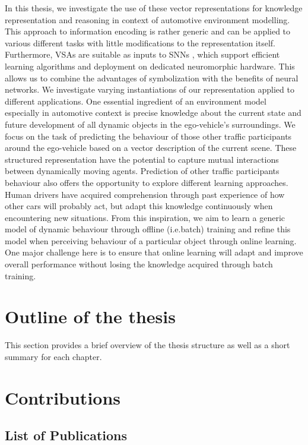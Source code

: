 In this thesis, we investigate the use of these vector representations for knowledge representation and reasoning in context of automotive environment modelling.
This approach to information encoding is rather generic and can be applied to various different tasks with little modifications to the representation itself.
Furthermore, \acp{VSA} are suitable as inputs to \acp{SNN} \cite{Eliasmith2013}, which support efficient learning algorithms and deployment on dedicated neuromorphic hardware.
This allows us to combine the advantages of symbolization with the benefits of neural networks.
We investigate varying instantiations of our representation applied to different applications. 
One essential ingredient of an environment model especially in automotive context is precise knowledge about the current state and future development of all dynamic objects in the ego-vehicle's surroundings.
We focus on the task of predicting the behaviour of those other traffic participants around the ego-vehicle based on a vector description of the current scene.
These structured representation have the potential to capture mutual interactions between dynamically moving agents.
Prediction of other traffic participants behaviour also offers the opportunity to explore different learning approaches.
Human drivers have acquired comprehension through past experience of how other cars will probably act, but adapt this knowledge continuously when encountering new situations.
From this inspiration, we aim to learn a generic model of dynamic behaviour through offline (i.e.batch) training and refine this model when perceiving behaviour of a particular object through online learning.
One major challenge here is to ensure that online learning will adapt and improve overall performance without losing the knowledge acquired through batch training.

\section{Outline of the thesis}
This section provides a brief overview of the thesis structure as well as a short summary for each chapter.

\section{Contributions}
\subsection{List of Publications}
